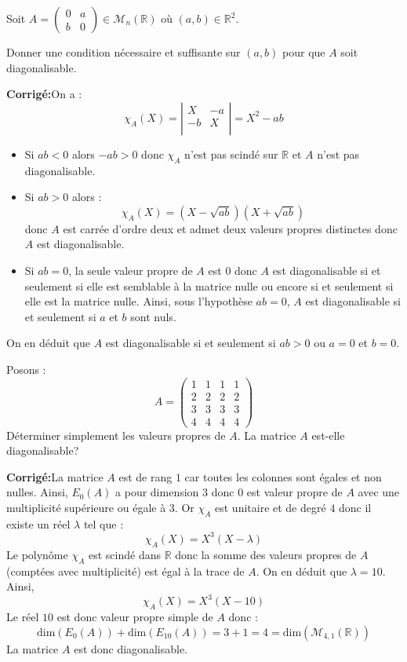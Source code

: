 \documentclass[a4paper,twoside,french,10pt]{VcCours}
\newcommand{\corr}{\textbf{Corrigé:}}
\begin{document}
\begin{Exercice}{} Soit $A= \begin{pmatrix}
0 & a \\
b & 0
\end{pmatrix} \in \mathcal{M}_n(\mathbb{R})$ où $(a,b) \in \mathbb{R}^2$. 

Donner une condition nécessaire et suffisante sur $(a,b)$ pour que $A$ soit diagonalisable.
\end{Exercice}

\corr On a :
$$ \chi_A(X) = \left\vert \begin{array}{cc}
X & -a \\
-b & X \\
\end{array}\right\vert = X^2-ab$$
\begin{itemize}
\item Si $ab<0$ alors $-ab>0$ donc $\chi_A$ n'est pas scindé sur $\mathbb{R}$ et $A$ n'est pas diagonalisable.
\item Si $ab>0$ alors :
$$ \chi_A(X) = (X- \sqrt{ab}) (X+ \sqrt{ab})$$
donc $A$ est carrée d'ordre deux et admet deux valeurs propres distinctes donc $A$ est diagonalisable.
\item Si $ab=0$, la seule valeur propre de $A$ est $0$ donc $A$ est diagonalisable si et seulement si elle est semblable à la matrice nulle ou encore si et seulement si elle est la matrice nulle. Ainsi, sous l'hypothèse $ab=0$, $A$ est diagonalisable si et seulement si $a$ et $b$ sont nuls.
\end{itemize}
On en déduit que $A$ est diagonalisable si et seulement si $ab>0$ ou $a=0$ et $b=0$.

\begin{Exercice}{} Posons :
    \[
    A =
    \begin{pmatrix}
      1 & 1 & 1 & 1 \\
      2 & 2 & 2 & 2 \\
      3 & 3 & 3 & 3 \\
      4 & 4 & 4 & 4
    \end{pmatrix}
    \]
Déterminer simplement les valeurs propres de $A$. La matrice $A$ est-elle diagonalisable?
\end{Exercice}

\corr La matrice $A$ est de rang $1$ car toutes les colonnes sont égales et non nulles. Ainsi, $E_0(A)$ a pour dimension $3$ donc $0$ est valeur propre de $A$ avec une multiplicité supérieure ou égale à $3$. Or $\chi_A$ est unitaire et de degré $4$ donc il existe un réel $\lambda$ tel que :
$$ \chi_A(X) = X^3(X-\lambda)$$
Le polynôme $\chi_A$ est scindé dans $\mathbb{R}$ donc la somme des valeurs propres de $A$ (comptées avec multiplicité) est égal à la trace de $A$. On en déduit que $\lambda = 10$. Ainsi,
$$ \chi_A(X)=X^3(X- 10)$$
Le réel $10$ est donc valeur propre simple de $A$ donc :
$$ \textrm{dim}(E_0(A))+ \textrm{dim}(E_{10}(A)) = 3+1 = 4 = \textrm{dim}(\mathcal{M}_{4,1}(\mathbb{R}))$$
La matrice $A$ est donc diagonalisable.
\end{document}
